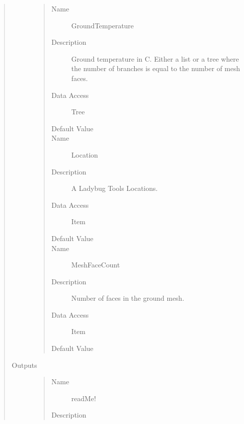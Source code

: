 \documentclass[letterpaper,10pt,english]{sphinxmanual}
\begin{document}
\begin{quote}
\begin{description}
\begin{quote}
\begin{description}
\item[{Name}] \leavevmode
GroundTemperature

\item[{Description}] \leavevmode
Ground temperature in C. Either a list or a tree where the number of branches is equal to the number
of mesh faces.

\item[{Data Access}] \leavevmode
Tree

\item[{Default Value}] \leavevmode
{}

\item[{Name}] \leavevmode
Location

\item[{Description}] \leavevmode
A Ladybug Tools Locations.

\item[{Data Access}] \leavevmode
Item

\item[{Default Value}] \leavevmode
{}

\item[{Name}] \leavevmode
MeshFaceCount

\item[{Description}] \leavevmode
Number of faces in the ground mesh.

\item[{Data Access}] \leavevmode
Item

\item[{Default Value}] \leavevmode
{}

\end{description}\end{quote}

\item[{Outputs}] \leavevmode\begin{quote}\begin{description}
\item[{Name}] \leavevmode
readMe!

\item[{Description}] \leavevmode
{}


\end{description}
\end{quote}
\end{description}
\end{quote}
\end{document}
